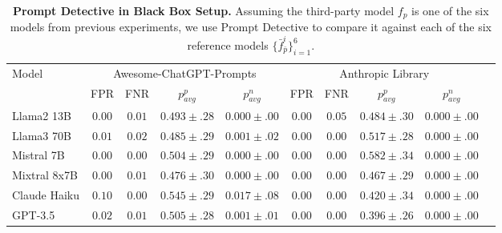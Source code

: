 \begin{table*}[t!]
  \vspace{-0.3cm}
  \caption{{\bf Prompt Detective in Black Box Setup.} Assuming the third-party model $f_p$ is one of the six models from previous experiments, we use Prompt Detective to compare it against each of the six reference models $\{\bar{f}^i_{\bar{p}}\}_{i=1}^6$.}
  \label{tab: black-box-results}
  \centering
  \setlength{\tabcolsep}{4pt}
  \begin{tabular}{lccccccccc}
    \toprule
  Model  & \multicolumn{4}{c}{Awesome-ChatGPT-Prompts} & \multicolumn{4}{c}{Anthropic Library} \\
    \cmidrule(lr){2-9}
    
  & FPR & FNR & $p^p_{avg}$ & $p^n_{avg}$ & FPR & FNR & $p^p_{avg}$ & $p^n_{avg}$ & \\
    \midrule
    
Llama2 13B & $0.00$ & $0.01$ & $0.493 \scriptscriptstyle \pm \scriptstyle .28$ & $0.000 \scriptscriptstyle \pm \scriptstyle .00$ & $0.00$ & $0.05$ & $0.484 \scriptscriptstyle \pm \scriptstyle .30$ & $0.000 \scriptscriptstyle \pm \scriptstyle .00$ \\
Llama3 70B & $0.01$ & $0.02$ & $0.485 \scriptscriptstyle \pm \scriptstyle .29$ & $0.001 \scriptscriptstyle \pm \scriptstyle .02$ & $0.00$ & $0.00$ & $0.517 \scriptscriptstyle \pm \scriptstyle .28$ & $0.000 \scriptscriptstyle \pm \scriptstyle .00$ \\
Mistral 7B & $0.00$ & $0.00$ & $0.504 \scriptscriptstyle \pm \scriptstyle .29$ & $0.000 \scriptscriptstyle \pm \scriptstyle .00$ & $0.00$ & $0.00$ & $0.582 \scriptscriptstyle \pm \scriptstyle .34$ & $0.000 \scriptscriptstyle \pm \scriptstyle .00$ \\
Mixtral 8x7B & $0.00$ & $0.01$ & $0.476 \scriptscriptstyle \pm \scriptstyle .30$ &$0.000 \scriptscriptstyle \pm \scriptstyle .00$ & $0.00$ & $0.00$ & $0.467 \scriptscriptstyle \pm \scriptstyle .29$ & $0.000 \scriptscriptstyle \pm \scriptstyle .00$ \\
Claude Haiku & $0.10$ & $0.00$ & $0.545 \scriptscriptstyle \pm \scriptstyle .29$  & $0.017 \scriptscriptstyle \pm \scriptstyle .08$ & $0.00$ & $0.00$ & $0.420 \scriptscriptstyle \pm \scriptstyle .34$ & $0.000 \scriptscriptstyle \pm \scriptstyle .00$\\
GPT-3.5 & $0.02$ & $0.01$ & $0.505 \scriptscriptstyle \pm \scriptstyle .28$ & $0.001 \scriptscriptstyle \pm \scriptstyle .01$ & $0.00$ & $0.00$ & $0.396 \scriptscriptstyle \pm \scriptstyle .26$ & $0.000 \scriptscriptstyle \pm \scriptstyle .00$ \\
\bottomrule


\end{tabular}
\end{table*}